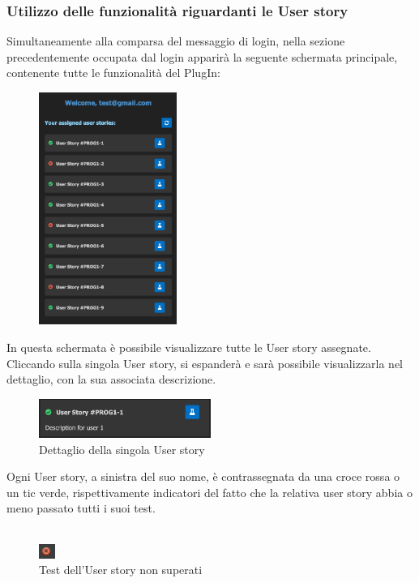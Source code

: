 \documentclass{article}
\begin{document}
    \subsubsection{Utilizzo delle funzionalità riguardanti le User story}
Simultaneamente alla comparsa del messaggio di login, nella sezione precedentemente occupata dal login apparirà la seguente schermata principale, contenente tutte le funzionalità del PlugIn:
    \begin{figure}[H]
      \centering
      \includegraphics[width=0.4\textwidth]{documenti/Screenshot manuale utente/vista_user_story.png}
      \caption{}
      \label{}
    \end{figure}
In questa schermata è possibile visualizzare tutte le User story assegnate. Cliccando sulla singola User story, si espanderà e sarà possibile visualizzarla nel dettaglio, con la sua associata descrizione.
    \begin{figure}[H]
      \centering
      \includegraphics[width=0.5\textwidth]{documenti/Screenshot manuale utente/dettaglio_user_story.png}
      \caption{Dettaglio della singola User story}
      \label{usdett}
    \end{figure}
Ogni User story, a sinistra del suo nome, è contrassegnata da una croce rossa o un tic verde, rispettivamente indicatori del fatto che la relativa user story abbia o meno passato tutti i suoi test.\\
\\
    \begin{figure}[H]
      \centering
      \includegraphics{documenti/Screenshot manuale utente/croce.png}
      \caption{Test dell'User story non superati}
      \label{testnonsup}
      \end{figure}
\end{document}
